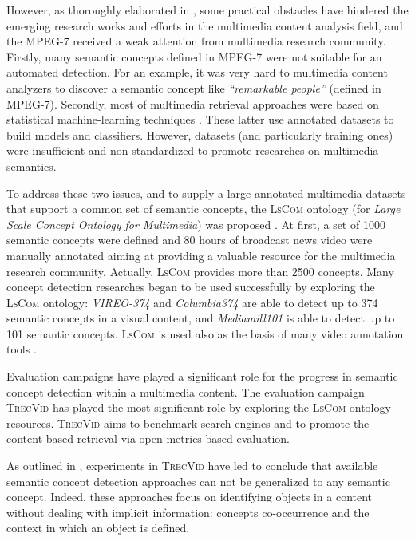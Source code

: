 	However, as thoroughly elaborated in \citep{Naphade2006}, some  practical obstacles have hindered the 
	emerging research works and efforts in the multimedia content analysis field, and the MPEG-7 received 
	a weak attention from multimedia research community. Firstly, many semantic concepts defined in MPEG-7 
	were not suitable for an automated detection. For an example, it was very hard to multimedia content 
	analyzers to  discover a semantic concept like \emph{``remarkable people''} (defined in MPEG-7). 
	Secondly, most of multimedia retrieval approaches were based on statistical machine-learning techniques 
	\citep{Deb2004}. These latter use annotated datasets to build models and classifiers. However, 
	datasets (and particularly training ones) were insufficient and non standardized to 
	promote researches on multimedia semantics.

	To address these two issues, and to supply a large annotated multimedia datasets that support 
	a common set of semantic concepts, the \textsc{LsCom} ontology (for \textit{Large Scale Concept 
	Ontology for Multimedia}) was proposed \citep{Kennedy2006,Naphade2006}. At first, a set of 1000 
	semantic concepts were defined and 80 hours of broadcast news video were manually annotated aiming 
	at providing a valuable resource for the multimedia research community. Actually, \textsc{LsCom} 
	provides more than 2500 concepts. Many concept detection researches began to be used successfully 
	by exploring the  \textsc{LsCom} ontology: \textit{VIREO-374} \citep{Jiang2007, Jiang2010} and 
	\textit{Columbia374} \citep{Yanagawa2007} are able to detect up to 374 semantic concepts in a
	visual content, and \textit{Mediamill101} \citep{Snoek2006} is able to detect up to 101 
	semantic concepts. \textsc{LsCom} is used also as the basis of many video annotation tools 
	\citep{Garnaud2006,Worring2006,Ksentini2012}.

	Evaluation campaigns have played a significant role for the progress in semantic concept 
	detection within a multimedia content. The evaluation campaign \textsc{TrecVid} 
	\citep{Smeaton2009, Over2013} has played the most significant role \citep{Snoek2010} 
	by exploring the \textsc{LsCom} ontology resources. \textsc{TrecVid} aims to benchmark 
	search engines and to promote the content-based retrieval via open metrics-based evaluation.

	As outlined in \citep{Snoek2010,Over2013}, experiments in \textsc{TrecVid} have led to conclude 
	that available semantic concept detection approaches can not be generalized to any semantic concept. 
	Indeed, these approaches focus on identifying  objects in a content without dealing with implicit 
	information: concepts co-occurrence and the context in which an object is defined.

